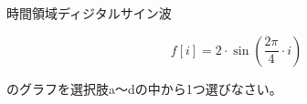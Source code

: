 時間領域ディジタルサイン波 

\[
f[i] = 2 \cdot \sin \left ( \frac{2 \pi}{4}  \cdot i \right )
\]

\noindent のグラフを選択肢a〜dの中から1つ選びなさい。
